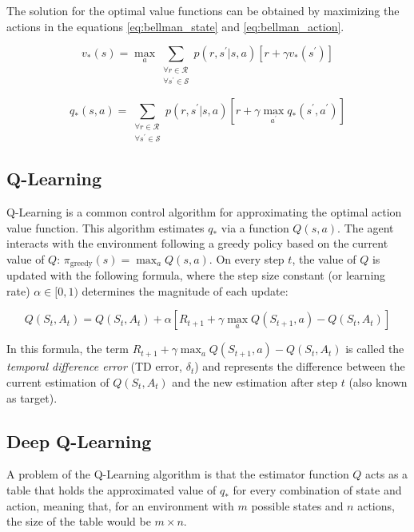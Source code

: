 The solution for the optimal value functions can be obtained by maximizing the actions in the equations \ref{eq:bellman_state} and \ref{eq:bellman_action}.

\begin{equation}
    v_\ast(s) = \max_{a} \sum_{\substack{\forall r \in \mathcal{R} \\ \forall s^\prime \in \mathcal{S}}}{p(r,s^\prime|s,a)[r + \gamma v_\ast(s^\prime)]}
\end{equation}

\begin{equation}
    q_\ast(s,a) = \sum_{\substack{\forall r \in \mathcal{R} \\ \forall s^\prime \in \mathcal{S}}}{p(r,s^\prime|s,a)[r + \gamma \max_{a^\prime} q_\ast(s^\prime,a^\prime)]}
\end{equation}

\subsection{Q-Learning}

Q-Learning \cite{Watkins:1992} is a common control algorithm for approximating the optimal action value function. This algorithm estimates $q_\ast$ via a function $Q(s,a)$. The agent interacts with the environment following a greedy policy based on the current value of $Q$: $\pi_\textrm{greedy}(s) = \max_a Q(s,a)$. On every step $t$, the value of $Q$ is updated with the following formula, where the step size constant (or learning rate) $\alpha \in [0,1)$ determines the magnitude of each update:

\begin{equation}
    Q(S_t,A_t) = Q(S_t,A_t) + \alpha[R_{t+1} + \gamma \max_a Q(S_{t+1},a) - Q(S_t,A_t)]
\end{equation}

In this formula, the term $R_{t+1} + \gamma \max_a Q(S_{t+1},a) - Q(S_t,A_t)$ is called the \textit{temporal difference error} (TD error, $\delta_t$) and represents the difference between the current estimation of $Q(S_t,A_t)$ and the new estimation after step $t$ (also known as target).

\subsection{Deep Q-Learning}

A problem of the Q-Learning algorithm is that the estimator function $Q$ acts as a table that holds the approximated value of $q_\ast$ for every combination of state and action, meaning that, for an environment with $m$ possible states and $n$ actions, the size of the table would be $m \times n$. 

